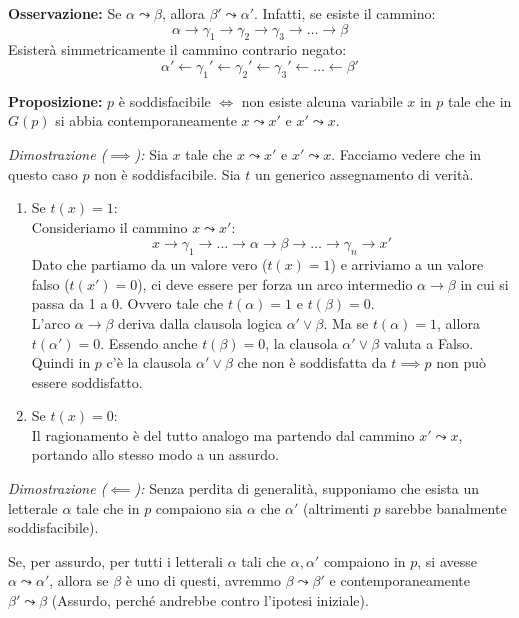 \textbf{Osservazione:} Se $\alpha \leadsto \beta$, allora $\beta' \leadsto \alpha'$.
Infatti, se esiste il cammino:
$$ \alpha \to \gamma_1 \to \gamma_2 \to \gamma_3 \to \dots \to \beta $$
Esisterà simmetricamente il cammino contrario negato:
$$ \alpha' \leftarrow \gamma_1' \leftarrow \gamma_2' \leftarrow \gamma_3' \leftarrow \dots \leftarrow \beta' $$

\vspace{0.5cm}
\textbf{Proposizione:} 
$p$ è soddisfacibile $\iff$ non esiste alcuna variabile $x$ in $p$ tale che in $G(p)$ si abbia contemporaneamente $x \leadsto x'$ e $x' \leadsto x$.

\textit{Dimostrazione ($\implies$):} 
Sia $x$ tale che $x \leadsto x'$ e $x' \leadsto x$. Facciamo vedere che in questo caso $p$ non è soddisfacibile.
Sia $t$ un generico assegnamento di verità.
\begin{enumerate}
    \item Se $t(x) = 1$: \\
    Consideriamo il cammino $x \leadsto x'$:
    $$ x \to \gamma_1 \to \dots \to \alpha \to \beta \to \dots \to \gamma_n \to x' $$
    Dato che partiamo da un valore vero ($t(x)=1$) e arriviamo a un valore falso ($t(x')=0$), ci deve essere per forza un arco intermedio $\alpha \to \beta$ in cui si passa da 1 a 0. Ovvero tale che $t(\alpha) = 1$ e $t(\beta) = 0$. \\
    L'arco $\alpha \to \beta$ deriva dalla clausola logica $\alpha' \lor \beta$.
    Ma se $t(\alpha) = 1$, allora $t(\alpha') = 0$. Essendo anche $t(\beta) = 0$, la clausola $\alpha' \lor \beta$ valuta a Falso. \\
    Quindi in $p$ c'è la clausola $\alpha' \lor \beta$ che non è soddisfatta da $t \implies p$ non può essere soddisfatto.
    
    \item Se $t(x) = 0$: \\
    Il ragionamento è del tutto analogo ma partendo dal cammino $x' \leadsto x$, portando allo stesso modo a un assurdo.
\end{enumerate}

\vspace{0.5cm}
\textit{Dimostrazione ($\impliedby$):}
Senza perdita di generalità, supponiamo che esista un letterale $\alpha$ tale che in $p$ compaiono sia $\alpha$ che $\alpha'$ (altrimenti $p$ sarebbe banalmente soddisfacibile).

Se, per assurdo, per tutti i letterali $\alpha$ tali che $\alpha, \alpha'$ compaiono in $p$, si avesse $\alpha \leadsto \alpha'$, allora se $\beta$ è uno di questi, avremmo $\beta \leadsto \beta'$ e contemporaneamente $\beta' \leadsto \beta$ (Assurdo, perché andrebbe contro l'ipotesi iniziale).

